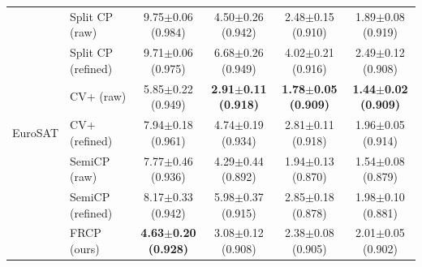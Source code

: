 \begin{table}[t]
\begin{tabular}{llcccc}
\midrule
\multirow{7}{*}{EuroSAT} & Split CP (raw) & 9.75$\pm$0.06 {\scriptsize(0.984)} & 4.50$\pm$0.26 {\scriptsize(0.942)} & 2.48$\pm$0.15 {\scriptsize(0.910)} & 1.89$\pm$0.08 {\scriptsize(0.919)}\\
 & Split CP (refined) & 9.71$\pm$0.06 {\scriptsize(0.975)} & 6.68$\pm$0.26 {\scriptsize(0.949)} & 4.02$\pm$0.21 {\scriptsize(0.916)} & 2.49$\pm$0.12 {\scriptsize(0.908)}\\
 & CV+ (raw) & 5.85$\pm$0.22 {\scriptsize(0.949)} & \textbf{2.91$\pm$0.11 {\scriptsize(0.918)}} & \textbf{1.78$\pm$0.05 {\scriptsize(0.909)}} & \textbf{1.44$\pm$0.02 {\scriptsize(0.909)}}\\
 & CV+ (refined) & 7.94$\pm$0.18 {\scriptsize(0.961)} & 4.74$\pm$0.19 {\scriptsize(0.934)} & 2.81$\pm$0.11 {\scriptsize(0.918)} & 1.96$\pm$0.05 {\scriptsize(0.914)}\\
 & SemiCP (raw) & 7.77$\pm$0.46 {\scriptsize(0.936)} & 4.29$\pm$0.44 {\scriptsize(0.892)} & 1.94$\pm$0.13 {\scriptsize(0.870)} & 1.54$\pm$0.08 {\scriptsize(0.879)}\\
 & SemiCP (refined) & 8.17$\pm$0.33 {\scriptsize(0.942)} & 5.98$\pm$0.37 {\scriptsize(0.915)} & 2.85$\pm$0.18 {\scriptsize(0.878)} & 1.98$\pm$0.10 {\scriptsize(0.881)}\\
 & FRCP (ours) & \textbf{4.63$\pm$0.20 {\scriptsize(0.928)}} & 3.08$\pm$0.12 {\scriptsize(0.908)} & 2.38$\pm$0.08 {\scriptsize(0.905)} & 2.01$\pm$0.05 {\scriptsize(0.902)}\\
\bottomrule
\end{tabular}
\end{table}
